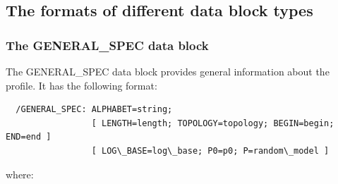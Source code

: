 \documentclass[a4paper,10pt,twoside]{scrartcl}
\begin{document}
  \subsection{The formats of different data block types}

  \subsubsection{The GENERAL\_SPEC data block}

  The GENERAL\_SPEC data block provides general information about the profile. It has the following format:
\begin{verbatim}
  /GENERAL_SPEC: ALPHABET=string;
                 [ LENGTH=length; TOPOLOGY=topology; BEGIN=begin; END=end ]
                 [ LOG\_BASE=log\_base; P0=p0; P=random\_model ]
\end{verbatim}
  where:
\end{document}
